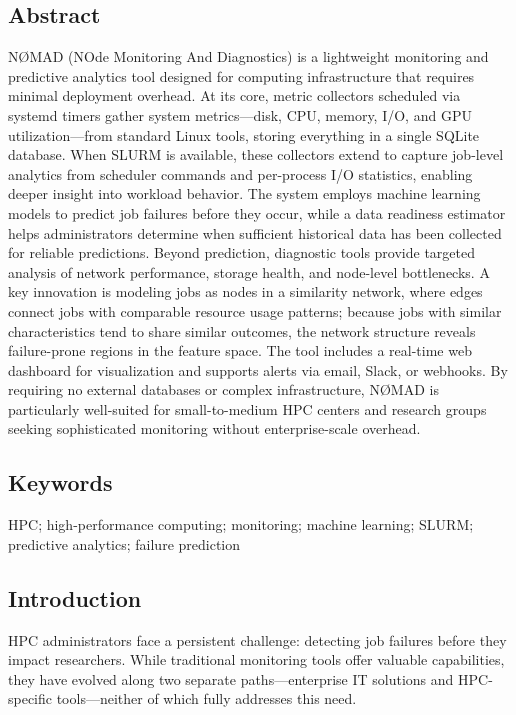 \documentclass[11pt,a4paper]{article}
\begin{document}
\subsection*{Abstract}
NØMAD (NOde Monitoring And Diagnostics) is a lightweight monitoring and predictive analytics tool designed for computing infrastructure that requires minimal deployment overhead. At its core, metric collectors scheduled via systemd timers gather system metrics---disk, CPU, memory, I/O, and GPU utilization---from standard Linux tools, storing everything in a single SQLite database. When SLURM is available, these collectors extend to capture job-level analytics from scheduler commands and per-process I/O statistics, enabling deeper insight into workload behavior. The system employs machine learning models to predict job failures before they occur, while a data readiness estimator helps administrators determine when sufficient historical data has been collected for reliable predictions. Beyond prediction, diagnostic tools provide targeted analysis of network performance, storage health, and node-level bottlenecks. A key innovation is modeling jobs as nodes in a similarity network, where edges connect jobs with comparable resource usage patterns; because jobs with similar characteristics tend to share similar outcomes, the network structure reveals failure-prone regions in the feature space. The tool includes a real-time web dashboard for visualization and supports alerts via email, Slack, or webhooks. By requiring no external databases or complex infrastructure, NØMAD is particularly well-suited for small-to-medium HPC centers and research groups seeking sophisticated monitoring without enterprise-scale overhead.

\subsection*{Keywords}
HPC; high-performance computing; monitoring; machine learning; SLURM; predictive analytics; failure prediction

\subsection*{Introduction}

HPC administrators face a persistent challenge: detecting job failures before they impact researchers. While traditional monitoring tools offer valuable capabilities, they have evolved along two separate paths---enterprise IT solutions and HPC-specific tools---neither of which fully addresses this need.
\end{document}
